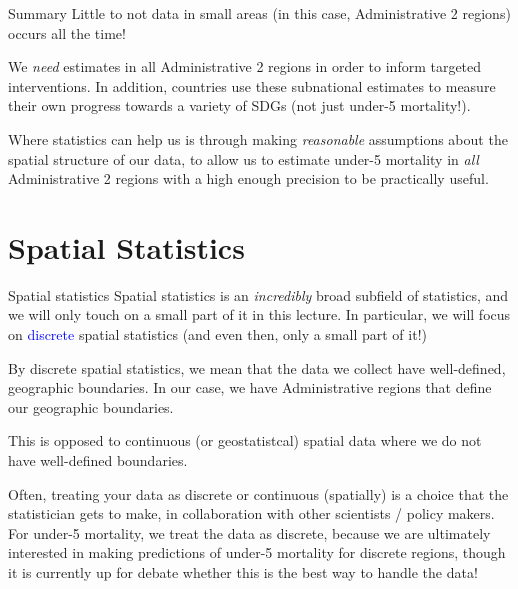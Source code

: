 \documentclass[10pt,t]{beamer}
\begin{document}
\begin{frame}{Summary}
Little to not data in small areas (in this case, Administrative 2 regions) occurs all the time!

\vspace{0.3cm}

We \textit{need} estimates in all Administrative 2 regions in order to inform targeted interventions. In addition, countries use these subnational estimates to measure their own progress towards a variety of SDGs (not just under-5 mortality!).

\vspace{0.3cm}

Where statistics can help us is through making \textit{reasonable} assumptions about the spatial structure of our data, to allow us to estimate under-5 mortality in \textit{all} Administrative 2 regions with a high enough precision to be practically useful.
\end{frame}

\section{Spatial Statistics}

\begin{frame}{Spatial statistics}
Spatial statistics is an \textit{incredibly} broad subfield of statistics, and we will only touch on a small part of it in this lecture. In particular, we will focus on \textcolor{blue}{discrete} spatial statistics (and even then, only a small part of it!)

\vspace{0.3cm}

By discrete spatial statistics, we mean that the data we collect have well-defined, geographic boundaries. In our case, we have Administrative regions that define our geographic boundaries. 

\vspace{0.3cm}

This is opposed to continuous (or geostatistcal) spatial data where we do not have well-defined boundaries. 

\vspace{0.3cm}

\pause \small Often, treating your data as discrete or continuous (spatially) is a choice that the statistician gets to make, in collaboration with other scientists / policy makers. For under-5 mortality, we treat the data as discrete, because we are ultimately interested in making predictions of under-5 mortality for discrete regions, though it is currently up for debate whether this is the best way to handle the data!

\end{frame}
\end{document}
